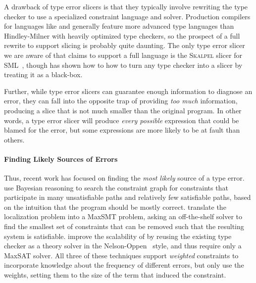 A drawback of type error slicers is that they typically involve
rewriting the type checker to use a specialized constraint language and
solver.
%
Production compilers for languages like \ocaml and \haskell generally
feature more advanced type languages than Hindley-Milner with heavily
optimized type checkers, so the prospect of a full rewrite to support
slicing is probably quite daunting.
%
The only type error slicer we are aware of that claims to support a full
language is the \textsc{Skalpel} slicer for
\textsc{SML}~\citep{Rahli2015-tt}, though \citet{Schilling2011-yf} has
shown how to how to turn any type checker into a slicer by treating it
as a black-box.

Further, while type error slicers can guarantee enough information to
diagnose an error, they can fall into the opposite trap of providing
\emph{too much} information, producing a slice that is not much smaller
than the original program.
%
In other words, a type error slicer will produce \emph{every possible}
expression that could be blamed for the error, but some expressions are
more likely to be at fault than others.

\paragraph{Finding Likely Sources of Errors}
Thus, recent work has focused on finding the \emph{most likely} source
of a type error.
%
\citeauthor{Zhang2015-yu}~\citep{Zhang2014-lv,Zhang2015-yu} use Bayesian
reasoning to search the constraint graph for constraints that
participate in many unsatisfiable paths and relatively few satisfiable
paths, based on the intuition that the program should be mostly correct.
%
\citet{Pavlinovic2014-mr,Pavlinovic2015-kh} translate the localization
problem into a MaxSMT problem, asking an off-the-shelf solver to find
the smallest set of constraints that can be removed such that the
resulting system is satisfiable.
%
\citet{Loncaric2016-uk} improve the scalability of
\citeauthor{Pavlinovic2014-mr} by reusing the existing type checker as
a theory solver in the Nelson-Oppen~\citep{Nelson1979-td}
style, and thus require only a MaxSAT solver.
%
All three of these techniques support \emph{weighted} constraints to
incorporate knowledge about the frequency of different errors,
but only \citeauthor{Pavlinovic2014-mr} use the weights, setting them to
the size of the term that induced the constraint.



